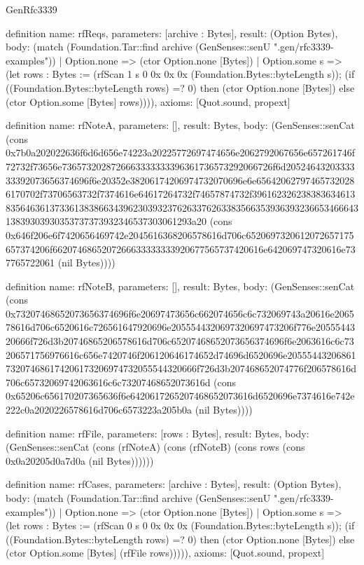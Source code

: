 \begin{lexlean}{GenRfc3339}
\begin{semanticmodule}
definition{
  name: rfReqs,
  parameters: [archive : Bytes],
  result: (Option Bytes),
  body: (match (Foundation.Tar::find archive (GenSenses::senU ".gen/rfc3339-examples"))
    | Option.none => (ctor Option.none [Bytes])
    | Option.some s => (let rows : Bytes := (rfScan 1 s 0 0x 0x 0x (Foundation.Bytes::byteLength s)); (if ((Foundation.Bytes::byteLength rows) =? 0) then (ctor Option.none [Bytes]) else (ctor Option.some [Bytes] rows)))),
  axioms: [Quot.sound, propext]
}

definition{
  name: rfNoteA,
  parameters: [],
  result: Bytes,
  body: (GenSenses::senCat (cons 0x7b0a202022636f6d6d656e74223a20225772697474656e2062792067656e657261746f72732f73656e7365732028726663333333396361736573292066726f6d2052464320333333392073656374696f6e20352e38206174206974732070696e6e656420627974657320286170702f73706563732f7374616e64617264732f74657874732f39616232623838363461383564636137336138386634396230393237626337626338356635393639323665346664313839303930353737373932346537303061293a20 (cons 0x646f206e6f7420656469742e2045616368206578616d706c6520697320612072657175657374206f6620746865207266633333333920677565737420616e642069747320616e737765722061 (nil Bytes))))
}

definition{
  name: rfNoteB,
  parameters: [],
  result: Bytes,
  body: (GenSenses::senCat (cons 0x73207468652073656374696f6e20697473656c662074656c6c732069743a20616e206578616d706c6520616c726561647920696e2055544320697320697473206f776e2055544320666f726d3b20746865206578616d706c65207468652073656374696f6e2063616c6c73206571756976616c656e7420746f206120646174652d74696d6520696e20555443206861732074686174206173206974732055544320666f726d3b207468652074776f206578616d706c65732069742063616c6c73207468652073616d (cons 0x65206c656170207365636f6e6420617265207468652073616d6520696e7374616e742e222c0a2020226578616d706c6573223a205b0a (nil Bytes))))
}

definition{
  name: rfFile,
  parameters: [rows : Bytes],
  result: Bytes,
  body: (GenSenses::senCat (cons (rfNoteA) (cons (rfNoteB) (cons rows (cons 0x0a20205d0a7d0a (nil Bytes))))))
}

definition{
  name: rfCases,
  parameters: [archive : Bytes],
  result: (Option Bytes),
  body: (match (Foundation.Tar::find archive (GenSenses::senU ".gen/rfc3339-examples"))
    | Option.none => (ctor Option.none [Bytes])
    | Option.some s => (let rows : Bytes := (rfScan 0 s 0 0x 0x 0x (Foundation.Bytes::byteLength s)); (if ((Foundation.Bytes::byteLength rows) =? 0) then (ctor Option.none [Bytes]) else (ctor Option.some [Bytes] (rfFile rows))))),
  axioms: [Quot.sound, propext]
}


\end{semanticmodule}
\end{lexlean}
